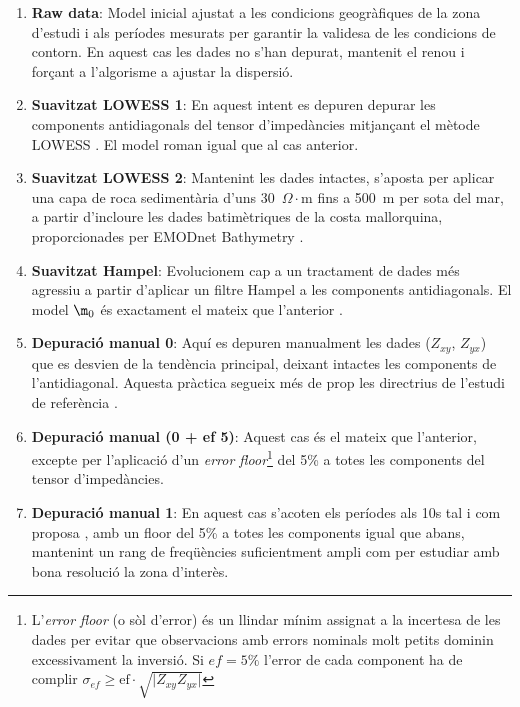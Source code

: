 \documentclass[11pt,a4paper,oneside]{article}
\begin{document}
\begin{enumerate}
    \item \textbf{Raw data}: Model inicial ajustat a les condicions geogràfiques de la zona d'estudi i als períodes mesurats per garantir la validesa de les condicions de contorn. En aquest cas les dades no s'han depurat, mantenit el renou i forçant a l'algorisme a ajustar la dispersió.
   
    \item \textbf{Suavitzat LOWESS 1}: En aquest intent es depuren depurar les components antidiagonals del tensor d'impedàncies mitjançant el mètode LOWESS \citep{cleveland1979}. El model roman igual que al cas anterior.
    
    \item \textbf{Suavitzat LOWESS 2}: Mantenint les dades intactes, s'aposta per aplicar una capa de roca sedimentària d'uns 30~$\Omega\cdot\mathrm{m}$ fins a 500~m per sota del mar, a partir d'incloure les dades batimètriques de la costa mallorquina, proporcionades per EMODnet Bathymetry \citep{emodnet}.
    
    \item \textbf{Suavitzat Hampel}: Evolucionem cap a un tractament de dades més agressiu a partir d'aplicar un filtre Hampel a les components antidiagonals. El model $\m_0$ és exactament el mateix que l'anterior \citep{hampel1974,davies1993}.
    
    \item \textbf{Depuració manual 0}: Aquí es depuren manualment les dades ($Z_{xy}$, $Z_{yx}$) que es desvien de la tendència principal, deixant intactes les components de l'antidiagonal. Aquesta pràctica segueix més de prop les directrius de l'estudi de referència \citep{arango2005}.
    
    \item \textbf{Depuració manual (0 + ef 5)}: Aquest cas és el mateix que l'anterior, excepte per l'aplicació d'un \emph{error floor}\footnote{L'\emph{error floor} (o sòl d'error) és un llindar mínim assignat a la incertesa de les dades per evitar que observacions amb errors nominals molt petits dominin excessivament la inversió. Si  $ef = 5\%$  l'error de cada component ha de complir $\sigma_{ef} \ge \text{ef} \cdot \sqrt{\vert Z_{xy} Z_{yx} \vert}$} del 5\% a totes les components del tensor d'impedàncies.

    \item \textbf{Depuració manual 1}: En aquest cas s'acoten els períodes als 10s tal i com proposa \citep{arango2005}, amb un floor del 5\% a totes les components igual que abans, mantenint un rang de freqüències suficientment ampli com per estudiar amb bona resolució la zona d'interès.


\end{enumerate}
\end{document}
